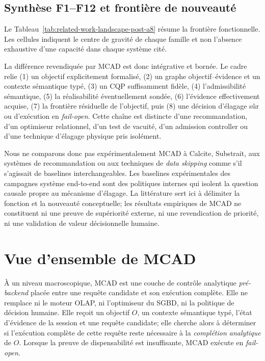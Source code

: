 \documentclass[journal]{IEEEtran}
\begin{document}
\subsection{Synthèse F1--F12 et frontière de nouveauté}

Le Tableau~\ref{tab:related-work-landscape-post-a8} résume la frontière fonctionnelle. Les cellules indiquent le centre de gravité de chaque famille et non l'absence exhaustive d'une capacité dans chaque système cité.



La différence revendiquée par MCAD est donc intégrative et bornée. Le cadre relie (1) un objectif explicitement formalisé, (2) un graphe objectif--évidence et un contexte sémantique typé, (3) un CQP suffisamment fidèle, (4) l'admissibilité sémantique, (5) la réalisabilité éventuellement sondée, (6) l'évidence effectivement acquise, (7) la frontière résiduelle de l'objectif, puis (8) une décision d'élagage sûr ou d'exécution en \emph{fail-open}. Cette chaîne est distincte d'une recommandation, d'un optimiseur relationnel, d'un test de vacuité, d'un admission controller ou d'une technique d'élagage physique pris isolément.

Nous ne comparons donc pas expérimentalement MCAD à Calcite, Substrait, aux systèmes de recommandation ou aux techniques de \emph{data skipping} comme s'il s'agissait de baselines interchangeables. Les baselines expérimentales des campagnes système end-to-end sont des politiques internes qui isolent la question causale propre au mécanisme d'élagage. La littérature sert ici à délimiter la fonction et la nouveauté conceptuelle; les résultats empiriques de MCAD ne constituent ni une preuve de supériorité externe, ni une revendication de priorité, ni une validation de valeur décisionnelle humaine.


\section{Vue d'ensemble de MCAD}
\label{sec:overview}

À un niveau macroscopique, MCAD est une couche de contrôle analytique \emph{pré-backend} placée entre une requête candidate et son exécution complète. Elle ne remplace ni le moteur OLAP, ni l'optimiseur du SGBD, ni la politique de décision humaine. Elle reçoit un objectif $O$, un contexte sémantique typé, l'état d'évidence de la session et une requête candidate; elle cherche alors à déterminer si l'exécution complète de cette requête reste nécessaire à la \emph{complétion analytique} de $O$. Lorsque la preuve de dispensabilité est insuffisante, MCAD exécute en \emph{fail-open}.
\end{document}
